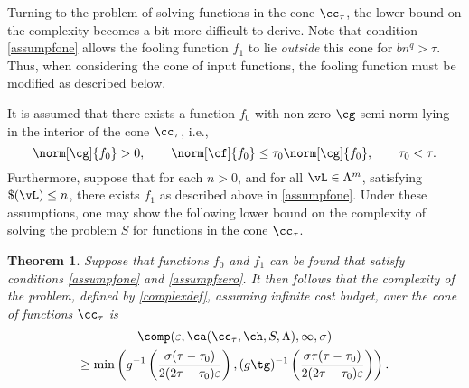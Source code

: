 \documentclass[final]{elsarticle}
\newtheorem{theorem}{Theorem}
\theoremstyle{definition}
\theoremstyle{remark}
\begin{document}
Turning to the problem of solving functions in the cone $\cc_{\tau}$, the lower bound on the complexity becomes a bit more difficult to derive.  Note that condition \eqref{assumpfone} allows the fooling function $f_1$ to lie \emph{outside} this cone for $bn^q > \tau$.  Thus, when considering the cone of input functions, the fooling function must be modified as described below.

It is assumed that there exists a function $f_0$ with non-zero $\cg$-semi-norm lying in the interior of the cone $\cc_{\tau}$, i.e.,
\begin{equation}
\label{assumpfzero}
\norm[\cg]{f_{0}} > 0, \qquad \norm[\cf]{f_{0}} \le \tau_0 \norm[\cg]{f_{0}}, \qquad \tau_0 < \tau.
\end{equation}
Furthermore, suppose that for each $n>0$, and for all $\vL \in \Lambda^m$, satisfying $\$(\vL)\le n$, there exists $f_1$ as described above in \eqref{assumpfone}. Under these assumptions, one may show the following lower bound on the complexity of solving the problem $S$ for functions in the cone $\cc_{\tau}$.

\begin{theorem} \label{complowbd} Suppose that functions $f_{0}$ and $f_1$ can be found that satisfy conditions \eqref{assumpfone} and \eqref{assumpfzero}.  It then follows that the complexity of the problem, defined by \eqref{complexdef}, assuming infinite cost budget, over the cone of functions $\cc_{\tau}$ is
\begin{multline*}
\comp(\varepsilon,\ca(\cc_{\tau},\ch,S,\Lambda),\infty,\sigma) \\
\ge \min\left(g^{-1}\left(\frac{\sigma(\tau-\tau_0)}{2(2\tau-\tau_0)\varepsilon}\right), (g\tg)^{-1}\left(\frac{\sigma\tau(\tau-\tau_0)}{2(2\tau-\tau_0)\varepsilon}\right) \right).
\end{multline*}
\end{theorem}
\end{document}
